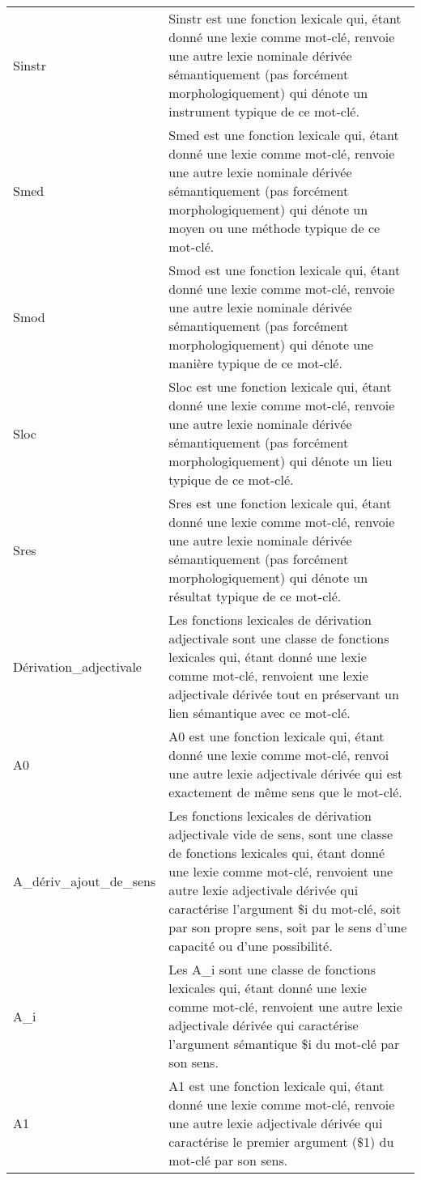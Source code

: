 \begin{longtable}{ll}
Sinstr & Sinstr est une fonction lexicale qui, étant donné une lexie comme mot-clé, renvoie une autre lexie nominale dérivée sémantiquement (pas forcément morphologiquement) qui dénote un instrument typique de ce mot-clé. \\
Smed & Smed est une fonction lexicale qui, étant donné une lexie comme mot-clé, renvoie une autre lexie nominale dérivée sémantiquement (pas forcément morphologiquement) qui dénote un moyen ou une méthode typique de ce mot-clé. \\
Smod & Smod est une fonction lexicale qui, étant donné une lexie comme mot-clé, renvoie une autre lexie nominale dérivée sémantiquement (pas forcément morphologiquement) qui dénote une manière typique de ce mot-clé. \\
Sloc & Sloc est une fonction lexicale qui, étant donné une lexie comme mot-clé, renvoie une autre lexie nominale dérivée sémantiquement (pas forcément morphologiquement) qui dénote un lieu typique de ce mot-clé. \\
Sres & Sres est une fonction lexicale qui, étant donné une lexie comme mot-clé, renvoie une autre lexie nominale dérivée sémantiquement (pas forcément morphologiquement) qui dénote un résultat typique de ce mot-clé. \\
Dérivation\_adjectivale & Les fonctions lexicales de dérivation adjectivale sont une classe de fonctions lexicales qui, étant donné une lexie comme mot-clé, renvoient une lexie adjectivale dérivée tout en préservant un lien sémantique avec ce mot-clé. \\
A0 & A0 est une fonction lexicale qui, étant donné une lexie comme mot-clé, renvoi une autre lexie adjectivale dérivée qui est exactement de même sens que le mot-clé. \\
A\_dériv\_ajout\_de\_sens & Les fonctions lexicales de dérivation adjectivale vide de sens, sont une classe de fonctions lexicales qui, étant donné une lexie comme mot-clé, renvoient une autre lexie adjectivale dérivée qui caractérise l'argument \$i du mot-clé, soit par son propre sens, soit par le sens d'une capacité ou d'une possibilité. \\
A\_i & Les A\_i sont une classe de fonctions lexicales qui, étant donné une lexie comme mot-clé, renvoient une autre lexie adjectivale dérivée qui caractérise l'argument sémantique \$i du mot-clé par son sens. \\
A1 & A1 est une fonction lexicale qui, étant donné une lexie comme mot-clé, renvoie une autre lexie adjectivale dérivée qui caractérise le premier argument (\$1) du mot-clé par son sens. \\

\end{longtable}
